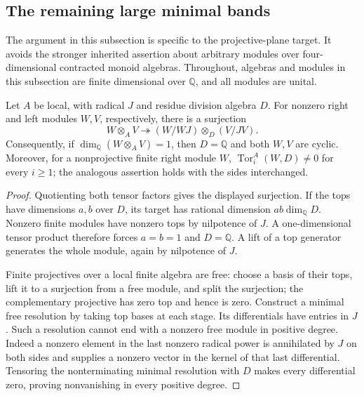 \subsection{The remaining large minimal bands}
\label{A:large-band-target-proof}

The argument in this subsection is specific to the projective-plane
target. It avoids the stronger inherited assertion about arbitrary
modules over four-dimensional contracted monoid algebras. Throughout,
algebras and modules in this subsection are finite dimensional over
$\mathbb Q$, and all modules are unital.

\begin{lemma}
\label{A:local-target-facts}
Let $A$ be local, with radical $J$ and residue division algebra $D$.
For nonzero right and left modules $W,V$, respectively, there is a
surjection
\[
 W\otimes_A V\twoheadrightarrow
 (W/WJ)\otimes_D(V/JV).
\]
Consequently, if $\dim_{\mathbb Q}(W\otimes_AV)=1$, then
$D=\mathbb Q$ and both $W,V$ are cyclic. Moreover, for a
nonprojective finite right module $W$,
$\operatorname{Tor}_i^A(W,D)\ne0$ for every $i\geq1$;
the analogous assertion holds with the sides interchanged.
\end{lemma}
\begin{proof}
Quotienting both tensor factors gives the displayed surjection.
If the tops have dimensions $a,b$ over $D$, its target has
rational dimension $ab\dim_{\mathbb Q}D$. Nonzero finite
modules have nonzero tops by nilpotence of $J$. A one-dimensional
tensor product therefore forces $a=b=1$ and $D=\mathbb Q$.
A lift of a top generator generates the whole module, again
by nilpotence of $J$.

Finite projectives over a local finite algebra are free: choose
a basis of their tops, lift it to a surjection from a free
module, and split the surjection; the complementary projective
has zero top and hence is zero. Construct a minimal free
resolution by taking top bases at each stage. Its differentials
have entries in $J$. Such a resolution cannot end with a
nonzero free module in positive degree. Indeed a nonzero
element in the last nonzero radical power is annihilated by
$J$ on both sides and supplies a nonzero vector in the kernel
of that last differential. Tensoring the nonterminating minimal
resolution with $D$ makes every differential zero, proving
nonvanishing in every positive degree.
\end{proof}

